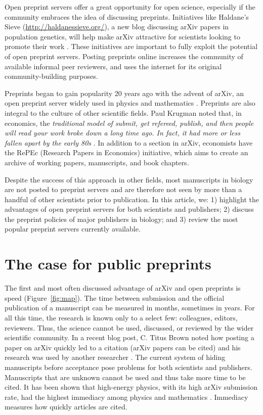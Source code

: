 \documentclass[letterpaper,twocolumn,superscriptaddress,showkeys,longbibliography]{revtex4-1}
\begin{document}
Open preprint servers offer a great opportunity for open science, especially if
the community embraces the idea of discussing preprints. Initiatives like
Haldane's Sieve (\href{http://haldanessieve.org/}{http://haldanessieve.org/}), a
new blog discussing arXiv papers in population genetics, will help make arXiv
attractive for scientists looking to promote their work \cite{lom12}. These initiatives are
important to fully exploit the potential of open preprint servers. Posting
preprints online increases the community of available informal peer reviewers,
and uses the internet for its original community-building purposes.

Preprints began to gain popularity 20 years ago with the advent of arXiv, an
open preprint server widely used in physics and mathematics \cite{gin11}.
Preprints are also integral to the culture of other scientific fields.  Paul
Krugman noted that, in economics, the \emph{traditional model of submit, get
refereed, publish, and then people will read your work broke down a long time
ago. In fact, it had more or less fallen apart by the early 80s} \cite{kru12}.
In addition to a section in arXiv, economists have the RePEc (Research Papers in
Economics) initiative, which aims to create an archive of working papers,
manuscripts, and book chapters.

Despite the success of this approach in other fields, most manuscripts in
biology are not posted to preprint servers and are therefore not seen by more
than a handful of other scientists prior to publication. In this article, we: 1)
highlight the advantages of open preprint servers for both scientists and
publishers; 2) discuss the preprint policies of major publishers in biology; and
3) review the most popular preprint servers currently available.

\section{The case for public preprints}

The first and most often discussed advantage of arXiv and open preprints is
speed (Figure~\ref{fig:map}). The time between submission and the official
publication of a manuscript can be measured in months, sometimes in years. For
all this time, the research is known only to a select few: colleagues, editors,
reviewers. Thus, the science cannot be used, discussed, or reviewed by the wider
scientific community. In a recent blog post, C. Titus Brown noted how posting a
paper on arXiv quickly led to a citation (arXiv papers can be cited) and his
research was used by another researcher \cite{bro12}. The current system of
hiding manuscripts before acceptance pose problems for both scientists and
publishers. Manuscripts that are unknown cannot be used and thus take more time
to be cited. It has been shown that high-energy physics, with its high arXiv
submission rate, had the highest immediacy among physics and mathematics
\cite{pra05}. Immediacy measures how quickly articles are cited. 
\end{document}
